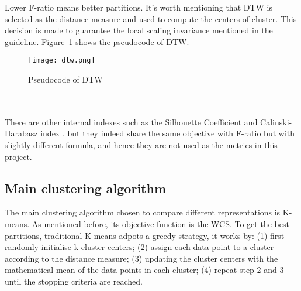 Lower F-ratio means better partitions. It's worth mentioning that DTW is selected as the distance measure and used to compute the centers of cluster. This decision is made to guarantee the local scaling invariance mentioned in the guideline. Figure~\ref{fig:dtwcode} shows the pseudocode of DTW.
\begin{figure}[!htbp]
    \centering
    \texttt{[image: dtw.png]}
    \caption{Pseudocode of DTW}
    \label{fig:dtwcode}
\end{figure} 
\\\\There are other internal indexes such as the Silhouette Coefficient \cite{rousseeuw1987silhouettes} and Calinski-Harabasz index \cite{calinski1974dendrite}, but they indeed share the same objective with F-ratio but with slightly different formula, and hence they are not used as the metrics in this project.


\subsection{Main clustering algorithm}
The main clustering algorithm chosen to compare different representations is K-means. As mentioned before, its objective function is the WCS. To get the best partitions, traditional K-means adpots a greedy strategy, it works by: (1) first randomly initialise k cluster centers; (2) assign each data point to a cluster according to the distance measure; (3) updating the cluster centers with the mathematical mean of the data points in each cluster; (4) repeat step 2 and 3 until the stopping criteria are reached. 




